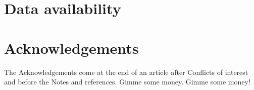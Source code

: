 \documentclass[twoside,twocolumn,9pt]{article}
\begin{document}
\section*{Data availability}


\section*{Acknowledgements}
The Acknowledgements come at the end of an article after Conflicts of interest and before the Notes and references.  Gimme some money. Gimme some money!



\balance


 
\end{document}
